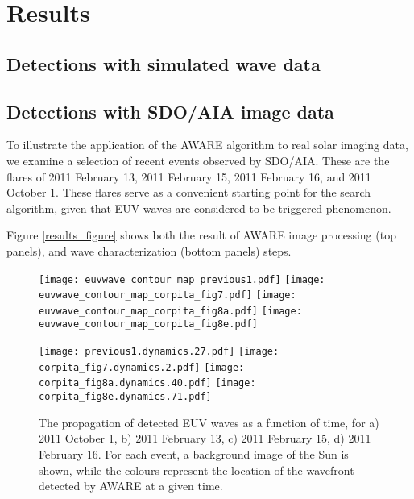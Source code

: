 \section{Results}\label{sec:results}

\subsection{Detections with simulated wave data}

\subsection{Detections with SDO/AIA image data}

To illustrate the application of the AWARE algorithm to real solar imaging data, we examine a selection of recent events observed by SDO/AIA. These are the flares of 2011 February 13, 2011 February 15, 2011 February 16, and 2011 October 1. These flares serve as a convenient starting point for the search algorithm, given that EUV waves are considered to be triggered phenomenon. 

Figure \ref{results_figure} shows both the result of AWARE image processing (top panels), and wave characterization (bottom panels) steps. 

\begin{figure}
\begin{center}
\texttt{[image: euvwave\_contour\_map\_previous1.pdf]}
\texttt{[image: euvwave\_contour\_map\_corpita\_fig7.pdf]}
\texttt{[image: euvwave\_contour\_map\_corpita\_fig8a.pdf]}
\texttt{[image: euvwave\_contour\_map\_corpita\_fig8e.pdf]}

\texttt{[image: previous1.dynamics.27.pdf]}
\texttt{[image: corpita\_fig7.dynamics.2.pdf]}
\texttt{[image: corpita\_fig8a.dynamics.40.pdf]}
\texttt{[image: corpita\_fig8e.dynamics.71.pdf]}
\caption{The propagation of detected EUV waves as a function of time, for a) 2011 October 1, b) 2011 February 13, c) 2011 February 15, d) 2011 February 16. For each event, a background image of the Sun is shown, while the colours represent the location of the wavefront detected by AWARE at a given time.}
\end{center}
\end{figure}




